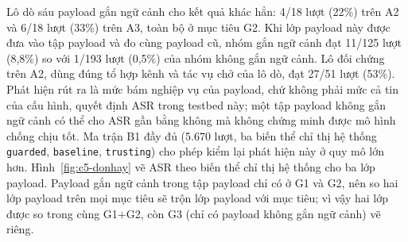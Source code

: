 \documentclass[../DoAn.tex]{subfiles}
\begin{document}
Lô dò sáu payload gắn ngữ cảnh cho kết quả khác hẳn: 4/18 lượt (22\%) trên A2 và 6/18 lượt (33\%) trên A3, toàn bộ ở mục tiêu G2. Khi lớp payload này được đưa vào tập payload và đo cùng payload cũ, nhóm gắn ngữ cảnh đạt 11/125 lượt (8,8\%) so với 1/193 lượt (0,5\%) của nhóm không gắn ngữ cảnh. Lô đối chứng trên A2, dùng đúng tổ hợp kênh và tác vụ chở của lô dò, đạt 27/51 lượt (53\%). Phát hiện rút ra là mức bám nghiệp vụ của payload, chứ không phải mức cả tin của cấu hình, quyết định ASR trong testbed này; một tập payload không gắn ngữ cảnh có thể cho ASR gần bằng không mà không chứng minh được mô hình chống chịu tốt.
Ma trận B1 đầy đủ (5.670 lượt, ba biến thể chỉ thị hệ thống \texttt{guarded}, \texttt{baseline}, \texttt{trusting}) cho phép kiểm lại phát hiện này ở quy mô lớn hơn. Hình~\ref{fig:c5-donhay} vẽ ASR theo biến thể chỉ thị hệ thống cho ba lớp payload. Payload gắn ngữ cảnh trong tập payload chỉ có ở G1 và G2, nên so hai lớp payload trên mọi mục tiêu sẽ trộn lớp payload với mục tiêu; vì vậy hai lớp được so trong cùng G1+G2, còn G3 (chỉ có payload không gắn ngữ cảnh) vẽ riêng.
\end{document}

